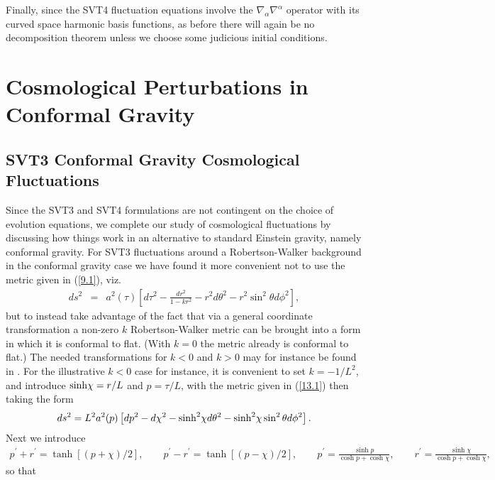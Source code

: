 \documentclass[aps,onecolumn,10pt]{revtex4}
\numberwithin{equation}{section}
\numberwithin{equation}{section}
\begin{document}
Finally, since the SVT4 fluctuation equations involve the $\nabla_{\alpha }\nabla^{\alpha }$ operator with its curved space harmonic basis functions, as before there will again be no decomposition theorem unless we choose some judicious initial conditions.

\section{Cosmological Perturbations in Conformal Gravity}
\label{S13}

\subsection{SVT3 Conformal Gravity Cosmological Fluctuations}

Since the SVT3 and SVT4 formulations are not contingent on the choice of evolution equations, we complete our study of cosmological fluctuations by discussing how things work in an alternative to standard Einstein gravity, namely conformal gravity.  For SVT3 fluctuations around a Robertson-Walker background in the conformal gravity case  we have found it more convenient not to use the metric given in (\ref{9.1}), viz.
% 
\begin{eqnarray}
ds^2&=&a^2(\tau)\left[d\tau^2-\frac{dr^2}{1-kr^2}-r^2d\theta^2-r^2\sin^2\theta d\phi^2\right],
\label{13.1}
\end{eqnarray}
% 
but to instead take advantage of the fact that via a general coordinate transformation a non-zero $k$ Robertson-Walker metric can be brought into a form in which it is conformal to flat. (With $k=0$ the metric already is conformal to flat.) The needed transformations for $k<0$ and $k>0$ may for instance be found in \cite{Amarasinghe2018}.  
For the illustrative $k<0$ case for instance, it is convenient to set $k=-1/L^2$, and introduce ${\rm sinh} \chi=r/L$ and $p=\tau/L$, with the  metric given in (\ref{13.1}) then taking the form
%
\begin{eqnarray}
ds^2=L^2a^2(p)\left[dp^2-d\chi^2 -{\rm sinh}^2\chi d\theta^2-{\rm sinh}^2\chi \sin^2\theta d\phi^2\right].
\label{13.2}
\end{eqnarray}
%
Next we introduce
%
\begin{eqnarray}
p^{\prime}+r^{\prime}=\tanh[(p+\chi)/2],\qquad p^{\prime}-r^{\prime}=\tanh[(p-\chi)/2],\qquad p^{\prime}=\frac{\sinh p}{\cosh p+\cosh \chi},\qquad r^{\prime}=\frac{\sinh \chi}{\cosh p+\cosh \chi},
\label{13.3}
\end{eqnarray}
%
so that
\end{document}
